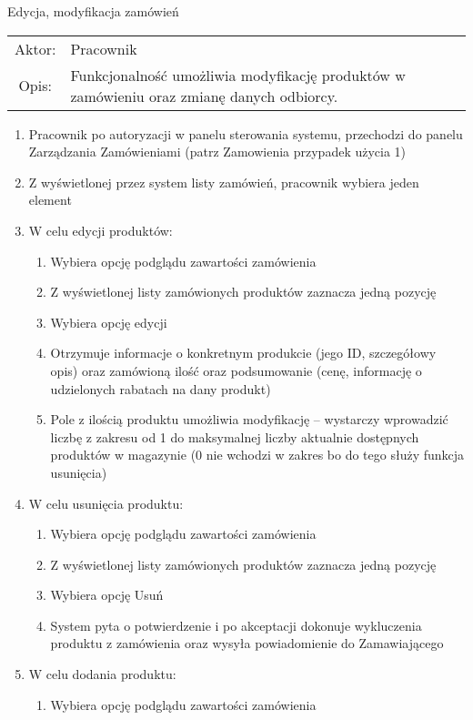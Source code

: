   \item Edycja, modyfikacja zamówień\\
  \begin{tabularx}{\linewidth}{c X}
  Aktor: & Pracownik \\
  Opis: & Funkcjonalność umożliwia modyfikację produktów w zamówieniu oraz
  zmianę danych odbiorcy.
  \end{tabularx}
	\begin{enumerate}
	  \item Pracownik po autoryzacji w panelu sterowania systemu, przechodzi do
	  panelu Zarządzania Zamówieniami (patrz Zamowienia przypadek użycia 1)
	  \item Z wyświetlonej przez system listy zamówień, pracownik wybiera jeden
	  element
	  \item W celu edycji produktów:
		\begin{enumerate}
		  \item Wybiera opcję podglądu zawartości zamówienia
		  \item Z wyświetlonej listy zamówionych produktów zaznacza jedną pozycję
		  \item Wybiera opcję edycji
		  \item Otrzymuje informacje o konkretnym produkcie (jego ID, szczegółowy opis)
		  oraz zamówioną ilość oraz podsumowanie (cenę, informację o udzielonych rabatach na dany produkt)
		  \item Pole z ilością produktu umożliwia modyfikację – wystarczy wprowadzić
		  liczbę z zakresu od 1 do maksymalnej liczby aktualnie dostępnych produktów w
		  magazynie (0 nie wchodzi w zakres bo do tego służy funkcja usunięcia)
		\end{enumerate}
	  \item W celu usunięcia produktu:
		\begin{enumerate}
		  \item Wybiera opcję podglądu zawartości zamówienia
		  \item Z wyświetlonej listy zamówionych produktów zaznacza jedną pozycję
		  \item Wybiera opcję Usuń
		  \item System pyta o potwierdzenie i po akceptacji dokonuje wykluczenia
		  produktu z zamówienia oraz wysyła powiadomienie do Zamawiającego
		\end{enumerate}
	  \item W celu dodania produktu:
		\begin{enumerate}
		  \item Wybiera opcję podglądu zawartości zamówienia

\end{enumerate}
\end{enumerate}
